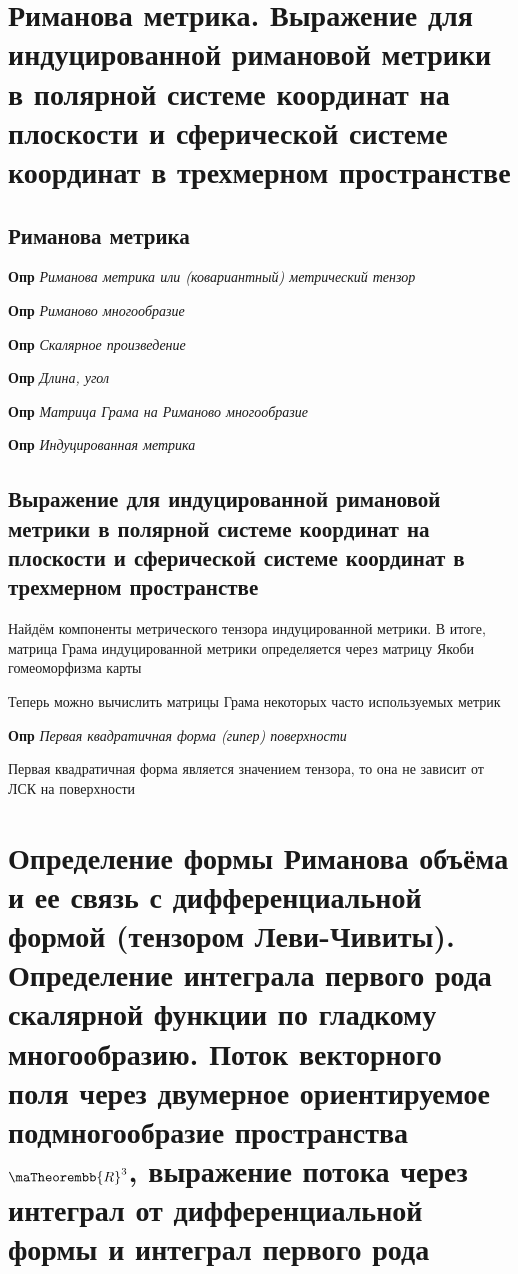 \documentclass[a4paper, 14pt]{article}
\begin{document}
    \section{Риманова метрика.
    Выражение для индуцированной римановой метрики в полярной системе координат на плоскости и сферической системе
    координат в трехмерном пространстве}
    
    \subsection{Риманова метрика}
    
    \textbf{Опр} \textit{Риманова метрика или (ковариантный) метрический тензор}
    
    \textbf{Опр} \textit{Риманово многообразие}
    
    \textbf{Опр} \textit{Скалярное произведение}
    
    \textbf{Опр} \textit{Длина, угол}
    
    \textbf{Опр} \textit{Матрица Грама на Риманово многообразие}
    
    \textbf{Опр} \textit{Индуцированная метрика}
    
    \subsection{Выражение для индуцированной римановой метрики в полярной системе координат на плоскости и
    сферической системе координат в трехмерном пространстве}
    
    Найдём компоненты метрического тензора индуцированной метрики.
    В итоге, матрица Грама индуцированной метрики определяется через матрицу Якоби гомеоморфизма карты
    
    Теперь можно вычислить матрицы Грама некоторых часто используемых метрик
    
    \textbf{Опр} \textit{Первая квадратичная форма (гипер) поверхности}
    
    Первая квадратичная форма является значением тензора, то она не зависит от ЛСК на поверхности
    
    \section{Определение формы Риманова объёма и ее связь с дифференциальной формой (тензором Леви-Чивиты).
    Определение интеграла первого рода скалярной функции по гладкому многообразию.
    Поток векторного поля через двумерное ориентируемое подмногообразие пространства $\maTheorembb{R}^3$, выражение
    потока через интеграл от дифференциальной формы и интеграл первого рода}
    
\end{document}
